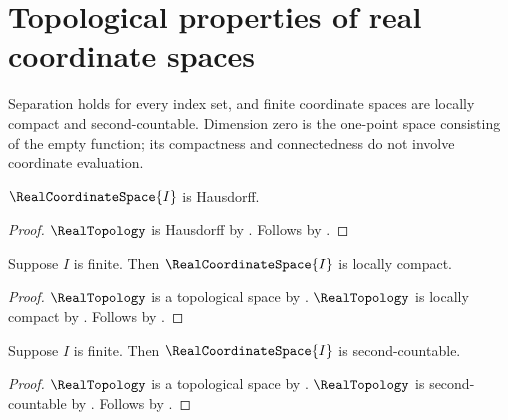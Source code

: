 \section{Topological properties of real coordinate spaces}











Separation holds for every index set, and finite coordinate spaces are locally
compact and second-countable. Dimension zero is the one-point space consisting
of the empty function; its compactness and connectedness do not involve
coordinate evaluation.

\begin{theorem}\label{real_coordinate_space_is_hausdorff}
    $\RealCoordinateSpace{I}$ is Hausdorff.
\end{theorem}
\begin{proof}
    $\RealTopology$ is Hausdorff by .
    Follows by .
\end{proof}

\begin{theorem}\label{real_coordinate_space_is_locally_compact}
    Suppose $I$ is finite.
    Then $\RealCoordinateSpace{I}$ is locally compact.
\end{theorem}
\begin{proof}
    $\RealTopology$ is a topological space by .
    $\RealTopology$ is locally compact by .
    Follows by .
\end{proof}

\begin{theorem}\label{real_coordinate_space_is_second_countable}
    Suppose $I$ is finite.
    Then $\RealCoordinateSpace{I}$ is second-countable.
\end{theorem}
\begin{proof}
    $\RealTopology$ is a topological space by .
    $\RealTopology$ is second-countable by .
    Follows by .
\end{proof}

